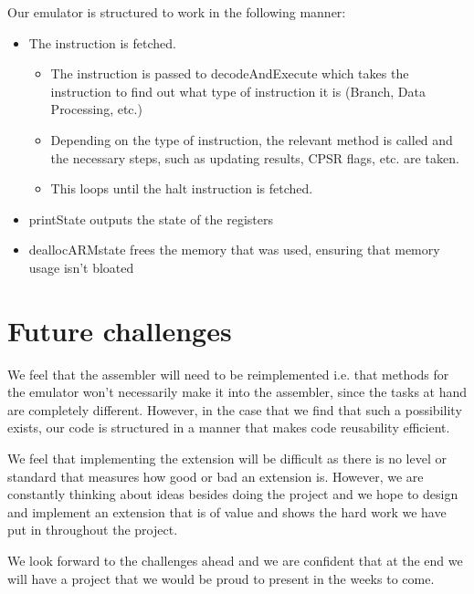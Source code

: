 \documentclass[11pt]{article}
\begin{document}
Our emulator is structured to work in the following manner:

\begin{itemize}

    \item The instruction is fetched.
    
    \begin{itemize}
    
        \item The instruction is passed to decodeAndExecute which  takes the instruction to find out what type of instruction it is (Branch, Data Processing, etc.)
        \item Depending on the type of instruction, the relevant method is called and the necessary steps, such as updating results, CPSR flags, etc. are taken.
        \item This loops until the halt instruction is fetched.
    \end{itemize}
  
    \item printState outputs the state of the registers
    \item deallocARMstate frees the memory that was used, ensuring that memory usage isn't bloated

\end{itemize}

\section{Future challenges}

We feel that the assembler will need to be reimplemented i.e. that methods for the emulator won’t necessarily make it into the assembler, since the tasks at hand are completely different. However, in the case that we find that such a possibility exists, our code is structured in a manner that makes code reusability efficient.

We feel that implementing the extension will be difficult as there is no level or standard that measures how good or bad an extension is. However, we are constantly thinking about ideas besides doing the project and we hope to design and implement an extension that is of value and shows the hard work we have put in throughout the project.

We look forward to the challenges ahead and we are confident that at the end we will have a project that we would be proud to present in the weeks to come.
\end{document}
